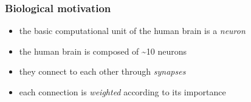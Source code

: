 \documentclass[xcolor=table]{beamer}
\begin{document}
\begin{mdframe}%

\frametitle{Biological motivation}\label{heading-sec-biological-motivation}%

\begin{itemize}%

\item{}
the basic computational unit of the human brain is a \emph{neuron}%

\item{}
the human brain is composed of \textasciitilde{}10 neurons%

\item{}
they connect to each other through  \emph{synapses}%

\item{}
each connection is \emph{weighted} according to its importance%
\end{itemize}%
\end{mdframe}\label{sec-biological-motivation}%
\end{document}
